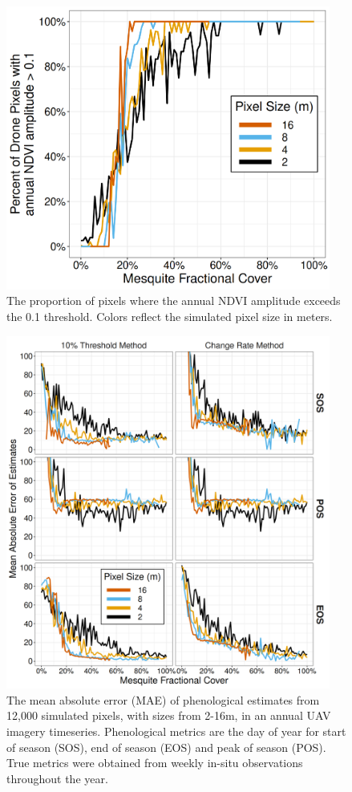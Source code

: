 \documentclass{article}
\begin{document}
\begin{figure}[h]
    \centering
    \includegraphics[width=0.95\textwidth]{figures/fig4_drone_detectability.png}
    \caption{The proportion of pixels where the annual NDVI amplitude exceeds the 0.1 threshold. Colors reflect the simulated pixel size in meters.}
    \label{fig4}
\end{figure}

\begin{figure}[h]
    \centering
    \includegraphics[width=0.95\textwidth]{figures/fig5_drone_mae.png}
    \caption{The mean absolute error (MAE) of phenological estimates from 12,000 simulated pixels, with sizes from 2-16m,  in an annual UAV imagery timeseries. Phenological metrics are the day of year for start of season (SOS), end of season (EOS) and peak of season (POS). True metrics were obtained from weekly in-situ observations throughout the year.}
    \label{fig5}
\end{figure}
\end{document}
